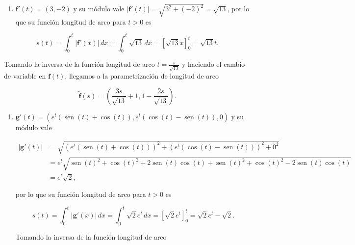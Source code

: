 \documentclass[
  spanish,
  a4paper,
]{scrreport}
\providecommand{\tightlist}{%
  \setlength{\itemsep}{0pt}\setlength{\parskip}{0pt}}
\theoremstyle{definition}
\theoremstyle{remark}
\begin{document}
\begin{tcolorbox}[enhanced jigsaw, arc=.35mm, bottomrule=.15mm, bottomtitle=1mm, breakable, colback=white, colbacktitle=quarto-callout-tip-color!10!white, colframe=quarto-callout-tip-color-frame, coltitle=black, left=2mm, leftrule=.75mm, opacityback=0, opacitybacktitle=0.6, rightrule=.15mm, title=\textcolor{quarto-callout-tip-color}{\faLightbulb}\hspace{0.5em}{Solución}, titlerule=0mm, toprule=.15mm, toptitle=1mm]

\begin{enumerate}
\def\labelenumi{\alph{enumi}.}
\tightlist
\item
  \(\mathbf{f}'(t)= (3,-2)\) y su módulo vale
  \(|\mathbf{f}'(t)|=\sqrt{3^2+(-2)^2} =\sqrt{13}\), por lo que su
  función longitud de arco para \(t>0\) es
\end{enumerate}

\[
s(t) 
= \int_0^t |\mathbf{f}'(x)|\,dx 
= \int_0^t \sqrt{13}\,dx 
= [\sqrt{13}x]_0^t 
= \sqrt{13}t.
\]

Tomando la inversa de la función longitud de arco
\(t=\frac{s}{\sqrt{13}}\) y haciendo el cambio de variable en
\(\mathbf{f}(t)\), llegamos a la parametrización de longitud de arco

\[
\tilde{\mathbf{f}}(s) = \left(\frac{3s}{\sqrt{13}}+1,1-\frac{2s}{\sqrt{13}}\right).
\]

\begin{enumerate}
\def\labelenumi{\alph{enumi}.}
\item
  \(\mathbf{g}'(t)= (e^t(\operatorname{sen}(t)+\cos(t)), e^t(\cos(t)-\operatorname{sen}(t)), 0)\)
  y su módulo vale

  \begin{align*}
  |\mathbf{g}'(t)| 
  &= \sqrt{(e^t(\operatorname{sen}(t)+\cos(t)))^2 + (e^t(\cos(t)-\operatorname{sen}(t)))^2 + 0^2} \\
  &= e^t\sqrt{\operatorname{sen}(t)^2+\cos(t)^2+2\operatorname{sen}(t)\cos(t) + \operatorname{sen}(t)^2+\cos(t)^2-2\operatorname{sen}(t)\cos(t)} \\
  &= e^t\sqrt{2},
  \end{align*}

  por lo que su función longitud de arco para \(t>0\) es

  \[
  s(t) 
  = \int_0^t |\mathbf{g}'(x)|\,dx 
  = \int_0^t \sqrt{2}e^t\,dx 
  = [\sqrt{2}e^t]_0^t 
  = \sqrt{2}e^t-\sqrt{2}.
  \]

  Tomando la inversa de la función longitud de arco


\end{enumerate}
\end{tcolorbox}
\end{document}
